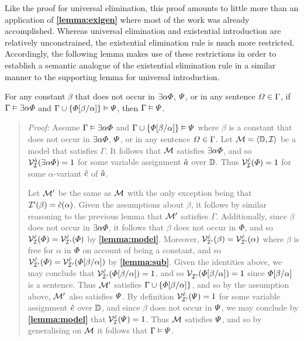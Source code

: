 Like the proof for universal elimination, this proof amounts to little more than an application of \textbf{\ref{lemma:exigen}} where most of the work was already accomplished.
Whereas universal elimination and existential introduction are relatively unconstrained, the existential elimination rule is much more restricted.
Accordingly, the following lemma makes use of these restrictions in order to establish a semantic analogue of the existential elimination rule in a similar manner to the supporting lemma for universal introduction.



\begin{Lthm} \label{lemma:exiinst}
  For any constant $\beta$ that does not occur in $\exists\alpha\varPhi$, $\varPsi$, or in any sentence $\varOmega\in\Gamma$, if $\Gamma \vDash \exists\alpha\varPhi$ and $\Gamma \cup \lbrace\varPhi[\beta/\alpha]\rbrace \vDash \varPsi$, then $\Gamma \vDash \varPsi$.
\end{Lthm}

\begin{quote} 
  \textit{Proof:} Assume $\Gamma \vDash \exists\alpha\varPhi$ and $\Gamma \cup \lbrace\varPhi[\beta/\alpha]\rbrace \vDash \varPsi$ where $\beta$ is a constant that does not occur in $\exists\alpha\varPhi$, $\varPsi$, or in any sentence $\varOmega\in\Gamma$. 
  Let $\mathcal{M}=\langle\mathbb{D},\mathcal{I}\rangle$ be a model that satisfies $\Gamma$.
  It follows that $\mathcal{M}$ satisfies $\exists \alpha\varPhi$, and so $\mathcal{V}_{\mathcal{I}}^{\hat{a}}(\exists \alpha\varPhi)=1$ for some variable assignment $\hat{a}$ over $\mathbb{D}$.
  Thus $\mathcal{V}_{\mathcal{I}}^{\hat{c}}(\varPhi)=1$ for some $\alpha$-variant $\hat{c}$ of $\hat{a}$.

  Let $\mathcal{M}'$ be the same as $\mathcal{M}$ with the only exception being that $\mathcal{I}'(\beta)=\hat{c}(\alpha)$.
  Given the assumptions about $\beta$, it follows by similar reasoning to the previous lemma that $\mathcal{M}'$ satisfies $\Gamma$.
  Additionally, since $\beta$ does not occur in $\exists \alpha\varPhi$, it follows that $\beta$ does not occur in $\varPhi$, and so $\mathcal{V}_{\mathcal{I}}^{\hat{c}}(\varPhi)=\mathcal{V}_{\mathcal{I}'}^{\hat{c}}(\varPhi)$ by \textbf{\ref{lemma:model}}.
  Moreover, $\mathcal{V}_{\mathcal{I}'}^{\hat{c}}(\beta)=\mathcal{V}_{\mathcal{I}'}^{\hat{c}}(\alpha)$ where $\beta$ is free for $\alpha$ in $\varPhi$ on account of being a constant, and so $\mathcal{V}_{\mathcal{I}'}^{\hat{c}}(\varPhi)=\mathcal{V}_{\mathcal{I}'}^{\hat{c}}(\varPhi[\beta/\alpha])$ by \textbf{\ref{lemma:sub}}. 
  Given the identities above, we may conclude that $\mathcal{V}_{\mathcal{I}'}^{\hat{c}}(\varPhi[\beta/\alpha])=1$, and so $\mathcal{V}_{\mathcal{I}'}^{}(\varPhi[\beta/\alpha])=1$ since $\varPhi[\beta/\alpha]$ is a sentence.
  Thus $\mathcal{M}'$ satisfies $\Gamma \cup \lbrace\varPhi[\beta/\alpha]\rbrace$, and so by the assumption above, $\mathcal{M}'$ also satisfies $\varPsi$.
  By definition $\mathcal{V}_{\mathcal{I}'}^{\hat{e}}(\varPsi)=1$ for some variable assignment $\hat{e}$ over $\mathbb{D}$, and since $\beta$ does not occur in $\varPsi$, we may conclude by \textbf{\ref{lemma:model}} that $\mathcal{V}_{\mathcal{I}}^{\hat{e}}(\varPsi)=1$.
  Thus $\mathcal{M}$ satisfies $\varPsi$, and so by generalising on $\mathcal{M}$ it follows that $\Gamma \vDash \varPsi$.
\end{quote}

